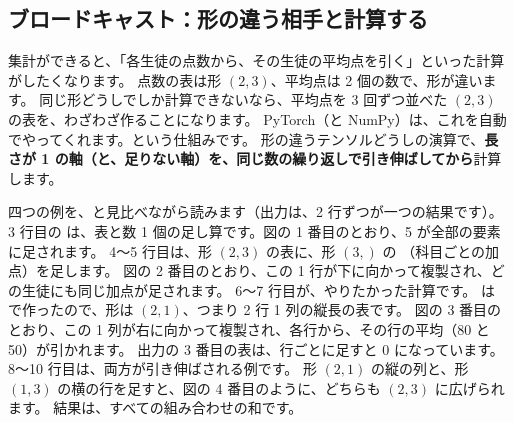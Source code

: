 \subsection*{ブロードキャスト：形の違う相手と計算する}

集計ができると、「各生徒の点数から、その生徒の平均点を引く」といった計算がしたくなります。
点数の表は形 $(2,3)$、平均点は 2 個の数で、形が違います。
同じ形どうしでしか計算できないなら、平均点を 3 回ずつ並べた $(2,3)$ の表を、わざわざ作ることになります。
PyTorch（と NumPy）は、これを自動でやってくれます。という仕組みです。
形の違うテンソルどうしの演算で、\textbf{長さが 1 の軸（と、足りない軸）を、同じ数の繰り返しで引き伸ばしてから}計算します。



四つの例を、と見比べながら読みます（出力は、2 行ずつが一つの結果です）。
3 行目の  は、表と数 1 個の足し算です。図の 1 番目のとおり、5 が全部の要素に足されます。
4〜5 行目は、形 $(2,3)$ の表に、形 $(3,)$ の （科目ごとの加点）を足します。
図の 2 番目のとおり、この 1 行が下に向かって複製され、どの生徒にも同じ加点が足されます。
6〜7 行目が、やりたかった計算です。
 は  で作ったので、形は $(2,1)$、つまり 2 行 1 列の縦長の表です。
図の 3 番目のとおり、この 1 列が右に向かって複製され、各行から、その行の平均（80 と 50）が引かれます。
出力の 3 番目の表は、行ごとに足すと 0 になっています。
8〜10 行目は、両方が引き伸ばされる例です。
形 $(2,1)$ の縦の列と、形 $(1,3)$ の横の行を足すと、図の 4 番目のように、どちらも $(2,3)$ に広げられます。
結果は、すべての組み合わせの和です。

